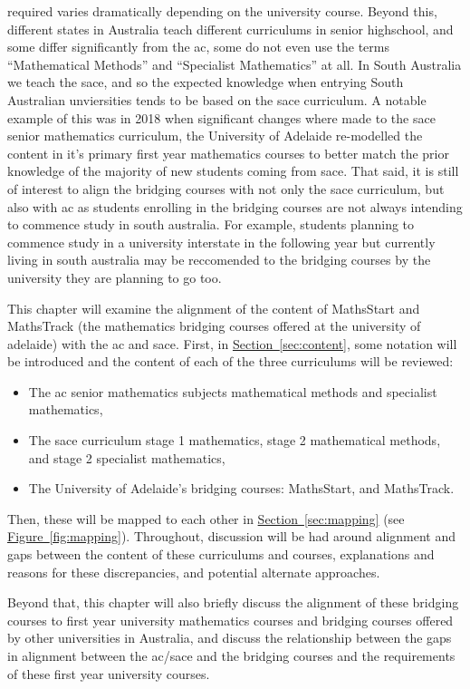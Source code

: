 \documentclass[twoside,12pt,a4paper]{report}
\newcommand{\refsec}[1]{\hyperref[sec:#1]{Section~\ref{sec:#1}}}
\newcommand{\reffig}[1]{\hyperref[fig:#1]{Figure~\ref{fig:#1}}}
\begin{document}
required varies dramatically depending on the university course. Beyond this, different states in Australia teach different curriculums in senior highschool, and some differ significantly from the \gls{ac}, some do not even use the terms ``Mathematical Methods'' and ``Specialist Mathematics'' at all. In South Australia we teach the \gls{sace}, and so the expected knowledge when entrying South Australian unviersities tends to be based on the \gls{sace} curriculum. A notable example of this was in 2018 when significant changes where made to the \gls{sace} senior mathematics curriculum, the University of Adelaide re-modelled the content in it's primary first year mathematics courses to better match the prior knowledge of the majority of new students coming from \gls{sace}. That said, it is still of interest to align the bridging courses with not only the \gls{sace} curriculum, but also with \gls{ac} as students enrolling in the bridging courses are not always intending to commence study in south australia. For example, students planning to commence study in a university interstate in the following year but currently living in south australia may be reccomended to the bridging courses by the university they are planning to go too.

This chapter will examine the alignment of the content of MathsStart and MathsTrack (the mathematics bridging courses offered at the university of adelaide) with the \gls{ac} and \gls{sace}. First, in \refsec{content}, some notation will be introduced and the content of each of the three curriculums will be reviewed:
\begin{itemize}
	\item The \gls{ac} senior mathematics subjects mathematical methods and specialist mathematics,
	\item The \gls{sace} curriculum stage 1 mathematics, stage 2 mathematical methods, and stage 2 specialist mathematics,
	\item The University of Adelaide's bridging courses: MathsStart, and MathsTrack.
\end{itemize}
Then, these will be mapped to each other in \refsec{mapping} (see \reffig{mapping}).
Throughout, discussion will be had around alignment and gaps between the content of these curriculums and courses, explanations and reasons for these discrepancies, and potential alternate approaches. 

Beyond that, this chapter will also briefly discuss the alignment of these bridging courses to first year university mathematics courses and bridging courses offered by other universities in Australia, and discuss the relationship between the gaps in alignment between the \gls{ac}/\gls{sace} and the bridging courses and the requirements of these first year university courses. 
\end{document}
